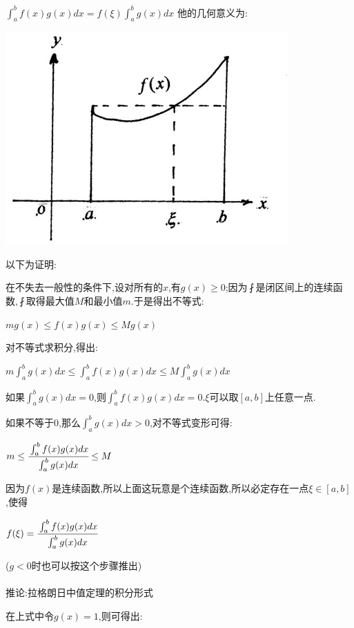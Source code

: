 \documentclass[UTF8,12pt]{ctexbook}
\newcommand{\defFunction}[1]{f(#1)}
\newcommand{\definiteIntegral}[2]{\int^{#1}_{#2}}
\begin{document}
{{{{$\definiteIntegral{b}{a}\defFunction{x}g(x)dx = \defFunction{\xi}\definiteIntegral{b}{a}g(x)dx$
他的几何意义为:

\begin{center}
  \includegraphics{resources/Geometric_explanation_of_the_mean_value_theorem_for_integration.jpg}
\end{center}

以下为证明:

在不失去一般性的条件下,设对所有的$x$,有$g(x) \geq 0$;因为$\fint$是闭区间上的连续函数,$\fint$取得最大值$M$和最小值$m$.于是得出不等式:

$mg(x) \leq \defFunction{x}g(x) \leq Mg(x)$

对不等式求积分,得出:

$m\definiteIntegral{b}{a}g(x)dx \leq \definiteIntegral{b}{a}\defFunction{x}g(x)dx \leq M\definiteIntegral{b}{a}g(x)dx$

如果$\definiteIntegral{b}{a}g(x)dx = 0$,则$\definiteIntegral{b}{a}\defFunction{x}g(x)dx = 0$.$\xi$可以取$[a,b]$上任意一点.

如果不等于$0$,那么$\definiteIntegral{b}{a}g(x)dx>0$,对不等式变形可得:

$m \leq \cfrac{\definiteIntegral{b}{a}\defFunction{x}g(x)dx}{\definiteIntegral{b}{a}g(x)dx} \leq M$

因为$f(x)$是连续函数,所以上面这玩意是个连续函数,所以必定存在一点$\xi\in[a,b]$,使得

$\defFunction{\xi} = \cfrac{\definiteIntegral{b}{a}\defFunction{x}g(x)dx}{\definiteIntegral{b}{a}g(x)dx}$

($g<0$时也可以按这个步骤推出)
\\\\
推论:拉格朗日中值定理的积分形式

在上式中令$g(x) = 1$,则可得出:

}}}}
\end{document}
